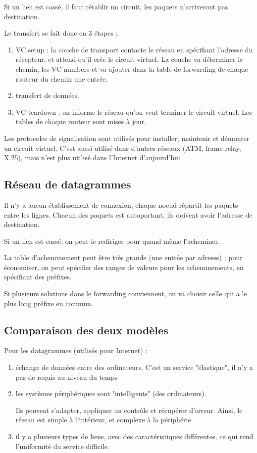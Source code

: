 	Si un lien est cassé, il faut rétablir un circuit, les paquets n'arriveront pas  destination. 
					
	Le transfert se fait donc en 3 étapes : 		 		
	\begin{enumerate} 			
		\item VC setup : la couche de transport contacte le réseau en spécifiant l'adresse du récepteur, et attend qu'il crée le circuit virtuel. La couche va déterminer le chemin, les VC numbers et va ajouter dans la table de forwarding de chaque routeur du chemin une entrée.
		\item transfert de données.
		\item VC teardown : on informe le réseau qu'on veut terminer le circuit virtuel. Les tables de chaque routeur sont mises  à jour. 
	\end{enumerate}		
	
	Les protocoles de signalisation sont utilisés pour installer, maintenir et démonter un circuit virtuel. C'est aussi utilisé dans d'autres réseaux (ATM, frame-relay, X.25),  mais n'est plus utilisé dans l'Internet d'aujourd'hui.
	
	\subsection{Réseau de datagrammes}
	
	Il n'y a aucun établissement de connexion, chaque noeud répartit les paquets entre les lignes. Chacun des paquets est autoportant, ils doivent avoir l'adresse de destination.
	
	
	Si un lien est cassé, on peut le rediriger pour quand même l'acheminer.
	
	La table d'acheminement peut être très grande (une entrée par adresse) ; pour économiser, on peut spécifier des ranges de valeurs pour les acheminements, en spécifiant des préfixes.
	


	Si plusieurs solutions dans le forwarding conviennent, on va choisir celle qui a le plus long préfixe en commun.
	
	\subsection{Comparaison des deux modèles}
	
	
	Pour les datagrammes (utilisés pour Internet) :
	\begin{enumerate}
		\item échange de données entre des ordinateurs. C'est un service "élastique", il n'y a pas de requis au niveau du temps
		\item les systèmes périphériques sont "intelligents" (des ordinateurs). 
		
		Ils peuvent s'adapter, appliquer un contrôle et récupérer d'erreur. Ainsi, le réseau est simple à l'intérieur, et complexe à la périphérie.
		\item il y a plusieurs types de liens, avec des caractéristiques différentes, ce qui rend l'uniformité du service difficile.
	\end{enumerate}
	
